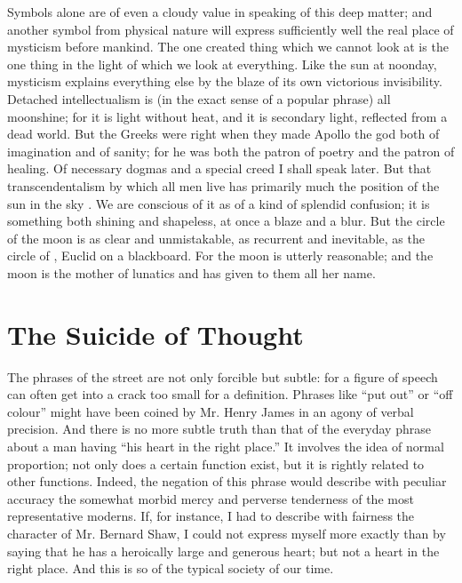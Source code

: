 \documentclass{book}
\begin{document}
Symbols alone are of even a cloudy value in speaking of this deep matter; and another symbol from physical nature will express sufficiently well the real place of mysticism before mankind. The one created thing which we cannot look at is the one thing in the light of which we look at everything. Like the sun at noonday, mysticism explains everything else by the blaze of its own victorious invisibility. Detached intellectualism is (in the exact sense of a popular phrase) all moonshine; for it is light without heat, and it is secondary light, reflected from a dead world. But the Greeks were right when they made Apollo the god both of imagination and of sanity; for he was both the patron of poetry and the patron of healing. Of necessary dogmas and a special creed I shall speak later. But that transcendentalism by which all men live has primarily much the position of the sun in the sky . We are conscious of it as of a kind of splendid confusion; it is something both shining and shapeless, at once a blaze and a blur. But the circle of the moon is as clear and unmistakable, as recurrent and inevitable, as the circle of , Euclid on a blackboard. For the moon is utterly reasonable; and the moon is the mother of lunatics and has given to them all her name.

\chapter{The Suicide of Thought}
\label{chapter-2}
The phrases of the street are not only forcible but subtle: for a figure of speech can often get into a crack too small for a definition. Phrases like “put out” or “off colour” might have been coined by Mr. Henry James in an agony of verbal precision. And there is no more subtle truth than that of the everyday phrase about a man having “his heart in the right place.” It involves the idea of normal proportion; not only does a certain function exist, but it is rightly related to other functions. Indeed, the negation of this phrase would describe with peculiar accuracy the somewhat morbid mercy and perverse tenderness of the most representative moderns. If, for instance, I had to describe with fairness the character of Mr. Bernard Shaw, I could not express myself more exactly than by saying that he has a heroically large and generous heart; but not a heart in the right place. And this is so of the typical society of our time.
\end{document}
